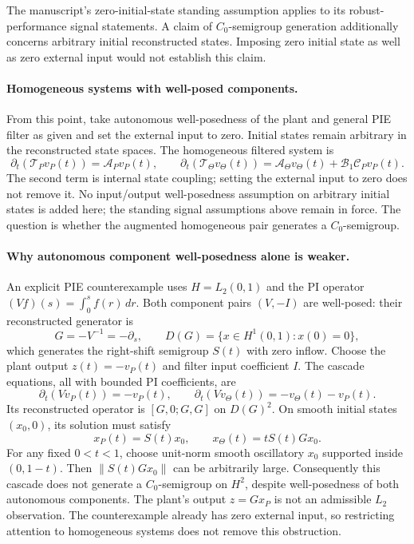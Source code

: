 \documentclass[11pt,a4paper]{article}
\begin{document}
The manuscript's zero-initial-state standing assumption applies to its
robust-performance signal statements. A claim of $C_0$-semigroup
generation additionally concerns arbitrary initial reconstructed
states. Imposing zero initial state as well as zero external input would
not establish this claim.

\paragraph{Homogeneous systems with well-posed components.}
From this point, take autonomous well-posedness of the plant and general
PIE filter as given and set the external input to zero. Initial states
remain arbitrary in the reconstructed state spaces. The homogeneous
filtered system is
\[
 \partial_t(\mathcal T_Pv_P(t))=\mathcal A_Pv_P(t),\qquad
 \partial_t(\mathcal T_\Theta v_\Theta(t))
 =\mathcal A_\Theta v_\Theta(t)+\mathcal B_1\mathcal C_Pv_P(t).
\]
The second term is internal state coupling; setting the external input
to zero does not remove it. No input/output well-posedness assumption
on arbitrary initial states is added here; the standing signal
assumptions above remain in force. The question is whether the augmented
homogeneous pair generates a $C_0$-semigroup.

\paragraph{Why autonomous component well-posedness alone is weaker.}
An explicit PIE counterexample uses $H=L_2(0,1)$ and the PI operator
$(Vf)(s)=\int_0^s f(r)\,dr$. Both component pairs $(V,-I)$ are
well-posed: their reconstructed generator is
\[
 G=-V^{-1}=-\partial_s,\qquad
 D(G)=\{x\in H^1(0,1):x(0)=0\},
\]
which generates the right-shift semigroup $S(t)$ with zero inflow.
Choose the plant output $z(t)=-v_P(t)$ and filter input coefficient $I$.
The cascade equations, all with bounded PI coefficients, are
\[
 \partial_t(Vv_P(t))=-v_P(t),\qquad
 \partial_t(Vv_\Theta(t))=-v_\Theta(t)-v_P(t).
\]
Its reconstructed operator is $[G,0;G,G]$ on $D(G)^2$. On smooth
initial states $(x_0,0)$, its solution must satisfy
\[
 x_P(t)=S(t)x_0,\qquad x_\Theta(t)=tS(t)Gx_0.
\]
For any fixed $0<t<1$, choose unit-norm smooth oscillatory $x_0$ supported
inside $(0,1-t)$. Then $\|S(t)Gx_0\|$ can be arbitrarily large.
Consequently this cascade does not generate a $C_0$-semigroup on $H^2$,
despite well-posedness of both autonomous components. The plant's output
$z=Gx_P$ is not an admissible $L_2$ observation. The counterexample
already has zero external input, so restricting attention to homogeneous
systems does not remove this obstruction.
\end{document}
